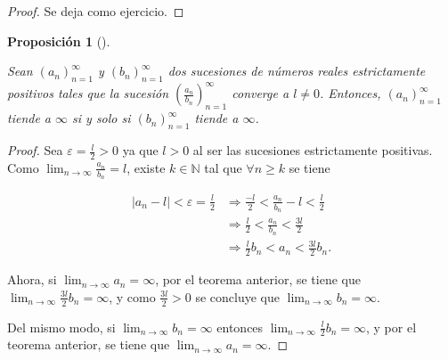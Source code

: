 \documentclass[
  a4paper,
]{scrreport}
\theoremstyle{definition}
\theoremstyle{plain}
\theoremstyle{definition}
\theoremstyle{definition}
\theoremstyle{plain}
\theoremstyle{plain}
\newtheorem{proposition}{Proposición}[chapter]
\theoremstyle{remark}
\begin{document}
\begin{tcolorbox}[enhanced jigsaw, leftrule=.75mm, colbacktitle=quarto-callout-note-color!10!white, toprule=.15mm, opacityback=0, opacitybacktitle=0.6, toptitle=1mm, breakable, bottomtitle=1mm, colframe=quarto-callout-note-color-frame, rightrule=.15mm, titlerule=0mm, title=\textcolor{quarto-callout-note-color}{\faInfo}\hspace{0.5em}{Demostración}, arc=.35mm, left=2mm, bottomrule=.15mm, colback=white, coltitle=black]

\begin{proof}
Se deja como ejercicio.
\end{proof}

\end{tcolorbox}

\begin{proposition}[]\protect\hypertarget{prp-cociente-sucesiones-propiamentes-divergentes}{}\label{prp-cociente-sucesiones-propiamentes-divergentes}

Sean \((a_n)_{n=1}^\infty\) y \((b_n)_{n=1}^\infty\) dos sucesiones de
números reales estrictamente positivos tales que la sucesión
\(\left(\frac{a_n}{b_n}\right)_{n=1}^\infty\) converge a \(l\neq 0\).
Entonces, \((a_n)_{n=1}^\infty\) tiende a \(\infty\) si y solo si
\((b_n)_{n=1}^\infty\) tiende a \(\infty\).

\end{proposition}

\begin{tcolorbox}[enhanced jigsaw, leftrule=.75mm, colbacktitle=quarto-callout-note-color!10!white, toprule=.15mm, opacityback=0, opacitybacktitle=0.6, toptitle=1mm, breakable, bottomtitle=1mm, colframe=quarto-callout-note-color-frame, rightrule=.15mm, titlerule=0mm, title=\textcolor{quarto-callout-note-color}{\faInfo}\hspace{0.5em}{Demostración}, arc=.35mm, left=2mm, bottomrule=.15mm, colback=white, coltitle=black]

\begin{proof}
Sea \(\varepsilon=\frac{l}{2}>0\) ya que \(l>0\) al ser las sucesiones
estrictamente positivas. Como \(\lim_{n\to\infty} \frac{a_n}{b_n}=l\),
existe \(k\in\mathbb{N}\) tal que \(\forall n\geq k\) se tiene

\begin{align*}
|a_n-l|<\varepsilon=\frac{l}{2} &\Rightarrow \frac{-l}{2}<\frac{a_n}{b_n}-l<\frac{l}{2}\\ 
&\Rightarrow \frac{l}{2}<\frac{a_n}{b_n}< \frac{3l}{2}\\ 
&\Rightarrow \frac{l}{2}b_n<a_n<\frac{3l}{2}b_n.
\end{align*}

Ahora, si \(\lim_{n\to\infty}a_n=\infty\), por el teorema anterior, se
tiene que \(\lim_{n\to\infty}\frac{3l}{2}b_n=\infty\), y como
\(\frac{3l}{2}>0\) se concluye que \(\lim_{n\to\infty}b_n=\infty\).

Del mismo modo, si \(\lim_{n\to\infty}b_n=\infty\) entonces
\(\lim_{n\to\infty}\frac{l}{2}b_n=\infty\), y por el teorema anterior,
se tiene que \(\lim_{n\to\infty}a_n=\infty\).
\end{proof}

\end{tcolorbox}
\end{document}
